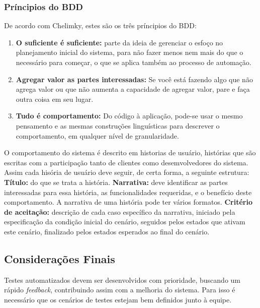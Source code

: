 \subsubsection{Príncipios do BDD}
De acordo com Chelimky, estes são os três príncipios do BDD:
\begin{enumerate}
\item \textbf{O suficiente é suficiente:} parte da ideia de gerenciar o esfoço no planejamento inicial do sistema, para não fazer menos nem mais do que o necessário para começar, o que se aplica também ao processo de automação.
\item \textbf{Agregar valor as partes interessadas:} Se você está fazendo algo que não agrega valor ou que não aumenta a capacidade de agregar valor, pare e faça outra coisa em seu lugar.
\item \textbf{Tudo é comportamento:} Do código à aplicação, pode-se usar o mesmo pensamento e as mesmas construções linguísticas para descrever o comportamento, em qualquer nível de granularidade. 
\end{enumerate}
%
O comportamento do sistema é descrito em historias de usuário, histórias que são escritas com a participação tanto de clientes como desemvolvedores do sistema. Assim cada hisória de usuário deve seguir, de certa forma, a seguinte estrutura:
%
\textbf{Título:} do que se trata a história.
%
\textbf{Narrativa:} deve identificar as partes interessadas para essa história, as funcionalidades requeridas, e o benefício deste comportamento. A narrativa de uma história pode ter vários formatos.
%
\textbf{Critério de aceitação:} descrição de cada caso específico da narrativa, iniciado pela especificação da condição inicial do cenário, seguidos pelos estados que ativam este cenário, finalizado pelos estados esperados ao final do cenário.
%

\subsection{Considerações Finais}
Testes automatizados devem ser desenvolvidos com prioridade, buscando um rápido \textit{feedback}, contribuindo assim com a melhoria do sistema. Para isso é necessário que os cenários de testes estejam bem definidos junto à equipe.
%
